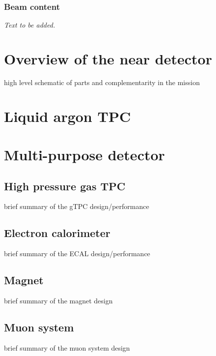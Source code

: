 \subsubsection{Beam \nue content}

{\it Text to be added.}

\section{Overview of the near detector}
\label{sec:exsum-nd-overview}
%

high level schematic of parts and complementarity in the mission

\section{Liquid argon TPC}
\label{sec:exsum-nd-lartpc}
%


\section{Multi-purpose detector}
\label{sec:exsum-nd-mpt}
%

\subsection{High pressure gas TPC}
\label{ssec:exsum-nd-mpt-gtpc}
brief summary of the gTPC design/performance

\subsection{Electron calorimeter}
\label{ssec:exsum-nd-mpt-ecal}
brief summary of the ECAL design/performance

\subsection{Magnet}
\label{ssec:exsum-nd-mpt-magnet}
brief summary of the magnet design

\subsection{Muon system}
\label{ssec:exsum-nd-mpt-muon}
brief summary of the muon system design

